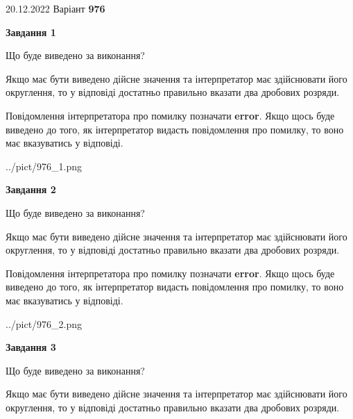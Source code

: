 \documentclass[12pt, ukrainian]{article}
\begin{document}
{20.12.2022 Варіант \No \textbf { 976 }\par}
{
\begin {Large}

{\begin {center}\textbf{Завдання 1}\end {center}}\par
Що буде виведено за виконання? \par

Якщо має бути виведено дійсне значення та інтерпретатор має здійснювати його округлення, 
то у відповіді достатньо правильно вказати два дробових розряди.

Повідомлення інтерпретатора про помилку позначати \textbf{error}.
Якщо щось буде виведено до того, як інтерпретатор видасть повідомлення про помилку, 
то воно має вказуватись у відповіді. \par

\begin{center}
	{../pict/976_1.png}
\end{center}
\newpage

{\begin {center}\textbf{Завдання 2}\end {center}}\par
Що буде виведено за виконання? \par

Якщо має бути виведено дійсне значення та інтерпретатор має здійснювати його округлення, 
то у відповіді достатньо правильно вказати два дробових розряди.

Повідомлення інтерпретатора про помилку позначати \textbf{error}.
Якщо щось буде виведено до того, як інтерпретатор видасть повідомлення про помилку, 
то воно має вказуватись у відповіді. \par

\begin{center}
	{../pict/976_2.png}
\end{center}
\newpage

{\begin {center}\textbf{Завдання 3}\end {center}}\par
Що буде виведено за виконання? \par

Якщо має бути виведено дійсне значення та інтерпретатор має здійснювати його округлення, 
то у відповіді достатньо правильно вказати два дробових розряди.


\end{Large}}
\end{document}
